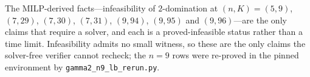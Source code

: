 The MILP-derived facts---infeasibility of $2$-domination at $(n,K) = (5,9)$,
$(7,29)$, $(7,30)$, $(7,31)$, $(9,94)$, $(9,95)$ and $(9,96)$---are the only
claims that require a solver, and each is a proved-infeasible status rather than
a time limit. Infeasibility admits no small witness, so these are the only claims
the solver-free verifier cannot recheck; the $n=9$ rows were re-proved in the
pinned environment by \texttt{gamma2\_n9\_lb\_rerun.py}.
